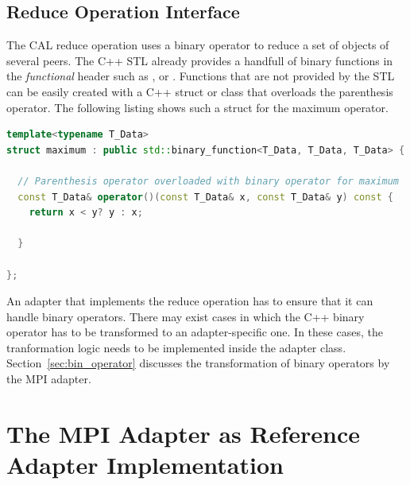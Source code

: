 \subsection{Reduce Operation Interface}
The CAL reduce operation uses a binary operator to reduce a set of objects
of several peers. The C++ STL already provides a handfull of binary
functions in the \emph{functional} header such as ,
 or 
\cite{ref:functional}. Functions that are not provided by the STL can
be easily created with a C++ struct or class that overloads the
parenthesis operator. The following listing shows such a struct for
the maximum operator.

\begin{minipage}[t]{\textwidth} 
\begin{lstlisting}[language=C++, breaklines=false, caption={\ }, label={lst:binary_function}, caption={Implementation of the binary operator maximum. These kind of binary operators can be used for the CAL reduce operation. Some binary operators are predefined in the C++ STL functional header.}]
template<typename T_Data>
struct maximum : public std::binary_function<T_Data, T_Data, T_Data> {

  // Parenthesis operator overloaded with binary operator for maximum
  const T_Data& operator()(const T_Data& x, const T_Data& y) const {
    return x < y? y : x;

  }

};
\end{lstlisting}
\end{minipage}%

\noindent An adapter that implements the reduce operation has to
ensure that it can handle binary operators.  There may exist cases in
which the C++ binary operator has to be transformed to an
adapter-specific one.  In these cases, the tranformation logic needs
to be implemented inside the adapter class.
Section~\ref{sec:bin_operator} discusses the transformation of binary
operators by the MPI adapter.

\section{The MPI Adapter as Reference Adapter Implementation}
\label{sec:cal_mpi_adapter}

